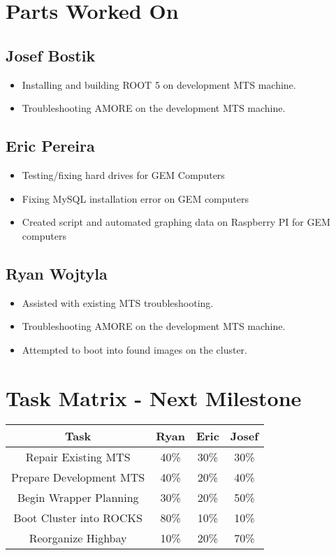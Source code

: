 \documentclass[12pt]{article}
\begin{document}
\section{Parts Worked On}

\subsection{Josef Bostik}

\begin{itemize}
\item Installing and building ROOT 5 on development MTS machine.
\item Troubleshooting AMORE on the development MTS machine.
\end{itemize}

\subsection{Eric Pereira}

\begin{itemize}
\item Testing/fixing hard drives for GEM Computers
\item Fixing MySQL installation error on GEM computers
\item Created script and automated graphing data on Raspberry PI for GEM computers
\end{itemize}

\subsection{Ryan Wojtyla}

\begin{itemize}
\item Assisted with existing MTS troubleshooting.
\item Troubleshooting AMORE on the development MTS machine.
\item Attempted to boot into found images on the cluster.

\end{itemize}

\section{Task Matrix - Next Milestone}

\begin{center}
  \begin{tabular}{|c|c|c|c|}
    \hline
    Task & Ryan & Eric & Josef \\
    \hline
    Repair Existing MTS & 40\% & 30\% & 30\% \\
    Prepare Development MTS & 40\% & 20\% & 40\% \\
    Begin Wrapper Planning & 30\% & 20\% & 50\% \\
    Boot Cluster into ROCKS & 80\% & 10\% & 10\% \\
    Reorganize Highbay & 10\% & 20\% & 70\% \\
    \hline
  \end{tabular}
\end{center}
\end{document}
